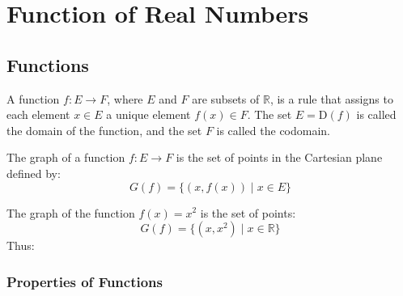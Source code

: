 \chapter{Function of Real Numbers}

\section{Functions}
\begin{definition}
    A function $f : E \to F$, where $E$ and $F$ are subsets of $\mathbb{R}$, is a rule that assigns to each element $x \in E$ a unique element $f(x) \in F$. The set $E = \text{D}(f)$ is called the domain of the function, and the set $F$ is called the codomain.
\end{definition}

\begin{definition}
    The graph of a function $f : E \to F$ is the set of points in the Cartesian plane defined by:
    \[
        G(f) = \{(x, f(x)) \mid x \in E\}
    \]
\end{definition}
\begin{eg}
    The graph of the function $f(x) = x^2$ is the set of points:
    \[
        G(f) = \{(x, x^2) \mid x \in \mathbb{R}\}
    \]
    Thus:
    \begin{center}
    \end{center}
\end{eg}

\subsection{Properties of Functions}


